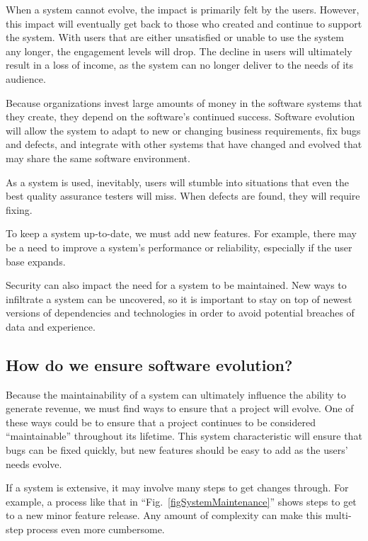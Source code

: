 \documentclass[12pt,conference]{IEEEtran}
\begin{document}
When a system cannot evolve, the impact is primarily felt by the users. However, this impact will eventually get back to those who created and continue to support the system. With users that are either unsatisfied or unable to use the system any longer, the engagement levels will drop. The decline in users will ultimately result in a loss of income, as the system can no longer deliver to the needs of its audience.

Because organizations invest large amounts of money in the software systems that they create, they depend on the software's continued success. Software evolution will allow the system to adapt to new or changing business requirements, fix bugs and defects, and integrate with other systems that have changed and evolved that may share the same software environment.

As a system is used, inevitably, users will stumble into situations that even the best quality assurance testers will miss. When defects are found, they will require fixing. 

To keep a system up-to-date, we must add new features. For example, there may be a need to improve a system's performance or reliability, especially if the user base expands.

Security can also impact the need for a system to be maintained. New ways to infiltrate a system can be uncovered, so it is important to stay on top of newest versions of dependencies and technologies in order to avoid potential breaches of data and experience.

\vspace{0.25cm}
\subsection{How do we ensure software evolution?}

Because the maintainability of a system can ultimately influence the ability to generate revenue, we must find ways to ensure that a project will evolve. One of these ways could be to ensure that a project continues to be considered ``maintainable'' throughout its lifetime. This system characteristic will ensure that bugs can be fixed quickly, but new features should be easy to add as the users' needs evolve.

If a system is extensive, it may involve many steps to get changes through. For example, a process like that in ``Fig.~\ref{figSystemMaintenance}'' shows steps to get to a new minor feature release. Any amount of complexity can make this multi-step process even more cumbersome.
\end{document}
